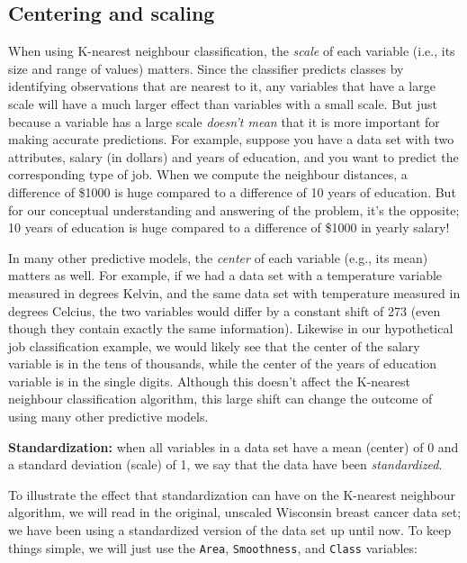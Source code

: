 \documentclass[
]{krantz}
\begin{document}
\hypertarget{centering-and-scaling}{%
\subsection{Centering and scaling}\label{centering-and-scaling}}

When using K-nearest neighbour classification, the \emph{scale} of each variable
(i.e., its size and range of values) matters. Since the classifier predicts
classes by identifying observations that are nearest to it, any variables that
have a large scale will have a much larger effect than variables with a small
scale. But just because a variable has a large scale \emph{doesn't mean} that it is
more important for making accurate predictions. For example, suppose you have a
data set with two attributes, salary (in dollars) and years of education, and
you want to predict the corresponding type of job. When we compute the
neighbour distances, a difference of \$1000 is huge compared to a difference of
10 years of education. But for our conceptual understanding and answering of
the problem, it's the opposite; 10 years of education is huge compared to a
difference of \$1000 in yearly salary!

In many other predictive models, the \emph{center} of each variable (e.g., its mean)
matters as well. For example, if we had a data set with a temperature variable
measured in degrees Kelvin, and the same data set with temperature measured in
degrees Celcius, the two variables would differ by a constant shift of 273
(even though they contain exactly the same information). Likewise in our
hypothetical job classification example, we would likely see that the center of
the salary variable is in the tens of thousands, while the center of the years
of education variable is in the single digits. Although this doesn't affect the
K-nearest neighbour classification algorithm, this large shift can change the
outcome of using many other predictive models.

\textbf{Standardization:} when all variables in a data set have a mean (center) of 0
and a standard deviation (scale) of 1, we say that the data have been
\emph{standardized}.

To illustrate the effect that standardization can have on the K-nearest
neighbour algorithm, we will read in the original, unscaled Wisconsin breast
cancer data set; we have been using a standardized version of the data set up
until now. To keep things simple, we will just use the \texttt{Area}, \texttt{Smoothness}, and \texttt{Class}
variables:
\end{document}
